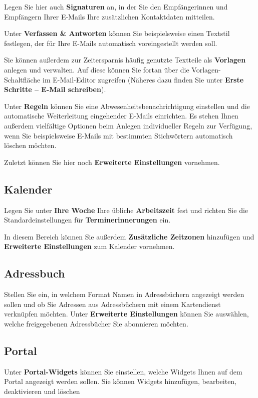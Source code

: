 \documentclass[
  letterpaper,
  DIV=11,
  numbers=noendperiod]{scrreprt}
\begin{document}
Legen Sie hier auch \textbf{Signaturen} an, in der Sie den
Empfängerinnen und Empfängern Ihrer E-Mails Ihre zusätzlichen
Kontaktdaten mitteilen.

Unter \textbf{Verfassen \& Antworten} können Sie beispielsweise einen
Textstil festlegen, der für Ihre E-Mails automatisch voreingestellt
werden soll.

Sie können außerdem zur Zeitersparnis häufig genutzte Textteile als
\textbf{Vorlagen} anlegen und verwalten. Auf diese können Sie fortan
über die Vorlagen-Schaltfläche im E-Mail-Editor zugreifen (Näheres dazu
finden Sie unter \textbf{Erste Schritte -- E-Mail schreiben}).

Unter \textbf{Regeln} können Sie eine Abwesenheitsbenachrichtigung
einstellen und die automatische Weiterleitung eingehender E-Mails
einrichten. Es stehen Ihnen außerdem vielfältige Optionen beim Anlegen
individueller Regeln zur Verfügung, wenn Sie beispielsweise E-Mails mit
bestimmten Stichwörtern automatisch löschen möchten.

Zuletzt können Sie hier noch \textbf{Erweiterte Einstellungen}
vornehmen.

\subsection{Kalender}\label{kalender-2}

Legen Sie unter \textbf{Ihre Woche} Ihre übliche \textbf{Arbeitszeit}
fest und richten Sie die Standardeinstellungen für
\textbf{Terminerinnerungen} ein.

In diesem Bereich können Sie außerdem \textbf{Zusätzliche Zeitzonen}
hinzufügen und \textbf{Erweiterte Einstellungen} zum Kalender vornehmen.

\subsection{Adressbuch}\label{adressbuch}

Stellen Sie ein, in welchem Format Namen in Adressbüchern angezeigt
werden sollen und ob Sie Adressen aus Adressbüchern mit einem
Kartendienst verknüpfen möchten. Unter \textbf{Erweiterte Einstellungen}
können Sie auswählen, welche freigegebenen Adressbücher Sie abonnieren
möchten.

\subsection{Portal}\label{portal}

Unter \textbf{Portal-Widgets} können Sie einstellen, welche Widgets
Ihnen auf dem Portal angezeigt werden sollen. Sie können Widgets
hinzufügen, bearbeiten, deaktivieren und löschen
\end{document}
